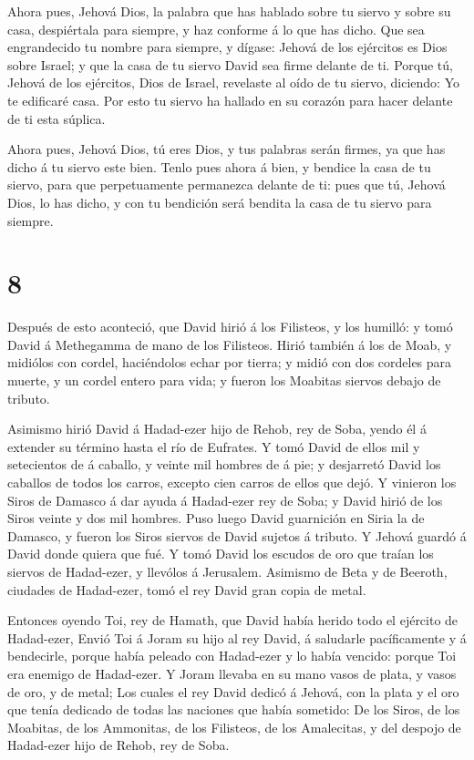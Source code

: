  Ahora pues, Jehová Dios, la palabra que has hablado sobre
tu siervo y sobre su casa, despiértala para siempre, y haz conforme á lo
que has dicho.  Que sea engrandecido tu nombre para
siempre, y dígase: Jehová de los ejércitos es Dios sobre Israel; y que
la casa de tu siervo David sea firme delante de ti.  Porque
tú, Jehová de los ejércitos, Dios de Israel, revelaste al oído de tu
siervo, diciendo: Yo te edificaré casa. Por esto tu siervo ha hallado en
su corazón para hacer delante de ti esta súplica.

 Ahora pues, Jehová Dios, tú eres Dios, y tus palabras
serán firmes, ya que has dicho á tu siervo este bien. 
Tenlo pues ahora á bien, y bendice la casa de tu siervo, para que
perpetuamente permanezca delante de ti: pues que tú, Jehová Dios, lo has
dicho, y con tu bendición será bendita la casa de tu siervo para
siempre.

\hypertarget{section-7}{%
\section{8}\label{section-7}}

 Después de esto aconteció, que David hirió á los Filisteos,
y los humilló: y tomó David á Methegamma de mano de los Filisteos.
 Hirió también á los de Moab, y midiólos con cordel,
haciéndolos echar por tierra; y midió con dos cordeles para muerte, y un
cordel entero para vida; y fueron los Moabitas siervos debajo de
tributo.

 Asimismo hirió David á Hadad-ezer hijo de Rehob, rey de
Soba, yendo él á extender su término hasta el río de Eufrates.
 Y tomó David de ellos mil y setecientos de á caballo, y
veinte mil hombres de á pie; y desjarretó David los caballos de todos
los carros, excepto cien carros de ellos que dejó.  Y
vinieron los Siros de Damasco á dar ayuda á Hadad-ezer rey de Soba; y
David hirió de los Siros veinte y dos mil hombres.  Puso
luego David guarnición en Siria la de Damasco, y fueron los Siros
siervos de David sujetos á tributo. Y Jehová guardó á David donde quiera
que fué.  Y tomó David los escudos de oro que traían los
siervos de Hadad-ezer, y llevólos á Jerusalem.  Asimismo de
Beta y de Beeroth, ciudades de Hadad-ezer, tomó el rey David gran copia
de metal.

 Entonces oyendo Toi, rey de Hamath, que David había herido
todo el ejército de Hadad-ezer,  Envió Toi á Joram su hijo
al rey David, á saludarle pacíficamente y á bendecirle, porque había
peleado con Hadad-ezer y lo había vencido: porque Toi era enemigo de
Hadad-ezer. Y Joram llevaba en su mano vasos de plata, y vasos de oro, y
de metal;  Los cuales el rey David dedicó á Jehová, con la
plata y el oro que tenía dedicado de todas las naciones que había
sometido:  De los Siros, de los Moabitas, de los Ammonitas,
de los Filisteos, de los Amalecitas, y del despojo de Hadad-ezer hijo de
Rehob, rey de Soba.

